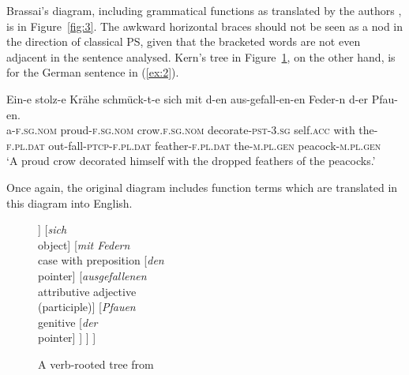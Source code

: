 \documentclass[output=paper
	        ,collection
	        ,collectionchapter
 	        ,biblatex
                ,babelshorthands
                ,newtxmath
                ,draftmode
                ,colorlinks, citecolor=brown
]{./langsci/langscibook}
\begin{document}
Brassai’s diagram, including grammatical functions as translated by the authors \citep{ImrenyiVladarTBA}, is in Figure~\ref{fig:3}. The awkward horizontal braces should not be seen as a nod in the direction of classical PS, given that the bracketed words are not even adjacent in the sentence analysed. Kern’s tree in Figure~\ref{fig:4}, on the other hand, is for the German sentence in (\ref{ex:2}).

\ea
\label{ex:2}
\gll Ein-e stolz-e Krähe schmück-t-e sich mit d-en aus-gefall-en-en Feder-n d-er Pfau-en.\\
	a\textsc{-f.sg.nom} proud\textsc{-f.sg.nom} crow\textsc{.f.sg.nom} decorate\textsc{-pst}\textsc{-3.sg} self\textsc{.acc} with the\textsc{-f.pl.dat} out-fall-\textsc{ptcp}-\textsc{f.pl.dat} feather\textsc{-f.pl.dat} the\textsc{-m.pl.gen} peacock-\textsc{m.pl.gen}\\

	\glt ‘A proud crow decorated himself with the dropped feathers of the peacocks.’
\z

Once again, the original diagram includes function terms which are translated in this diagram into English.

\begin{figure}
	\centering
\begin{forest}
[\emph{schmückte}\\finite verb
	[\emph{Krähe}\\subject word
		[\emph{eine}\\counter]
		[\emph{stolze}\\attributive adjective]
	]
	[\emph{sich}\\object]
	[\emph{mit Federn}\\case with preposition
		[\emph{den}\\pointer]
		[\emph{ausgefallenen}\\attributive adjective\\(participle)]
		[\emph{Pfauen}\\genitive
			[\emph{der}\\pointer]
		]
	]
]
\end{forest}
	\caption{A verb-rooted tree from \citet{Kern1884a-u}}
	\label{fig:4}
\end{figure}
\end{document}
